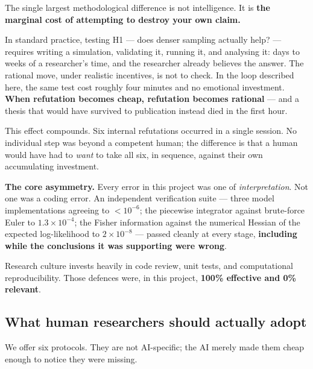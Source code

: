 \documentclass[11pt,a4paper]{article}
\begin{document}
The single largest methodological difference is not intelligence. It is
\textbf{the marginal cost of attempting to destroy your own claim.}

In standard practice, testing H1 --- does denser sampling actually help? --- requires
writing a simulation, validating it, running it, and analysing it: days to weeks of a
researcher's time, and the researcher already believes the answer. The rational move,
under realistic incentives, is not to check. In the loop described here, the same test
cost roughly four minutes and no emotional investment. \textbf{When refutation becomes
cheap, refutation becomes rational} --- and a thesis that would have survived to
publication instead died in the first hour.

This effect compounds. Six internal refutations occurred in a single session. No
individual step was beyond a competent human; the difference is that a human would have
had to \emph{want} to take all six, in sequence, against their own accumulating
investment.

\begin{tcolorbox}[keybox]
\textbf{The core asymmetry.} Every error in this project was one of
\emph{interpretation}. Not one was a coding error. An independent verification suite
--- three model implementations agreeing to $<10^{-6}$; the piecewise integrator against
brute-force Euler to $1.3\times10^{-4}$; the Fisher information against the numerical
Hessian of the expected log-likelihood to $2\times10^{-8}$ --- passed cleanly at every
stage, \textbf{including while the conclusions it was supporting were wrong}.

Research culture invests heavily in code review, unit tests, and computational
reproducibility. Those defences were, in this project, \textbf{100\% effective and
0\% relevant}.
\end{tcolorbox}

\subsection{What human researchers should actually adopt}

We offer six protocols. They are not AI-specific; the AI merely made them cheap enough
to notice they were missing.
\end{document}
